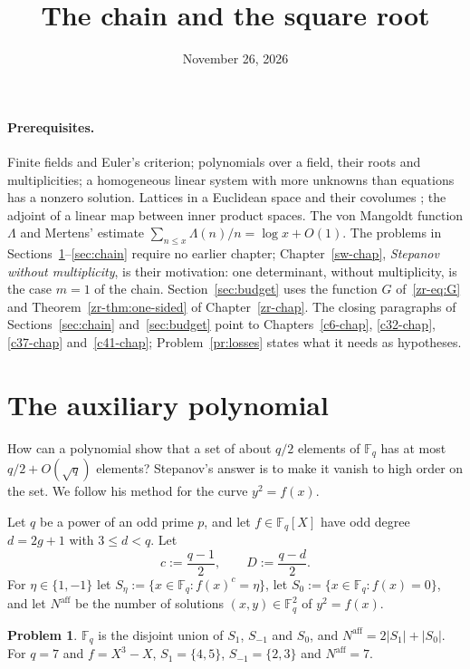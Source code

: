 \documentclass[reqno]{amsart}
\title{The chain and the square root}
\author{}
\date{November 26, 2026}
\newcounter{chap}
\theoremstyle{definition}
\newtheorem{problem}{Problem}[section]
\theoremstyle{plain}
\newcommand{\F}{\mathbb{F}}
\newcommand{\Naff}{N^{\mathrm{aff}}}
\begin{document}
\maketitle
{}\label{chap}

\paragraph{Prerequisites.}
Finite fields and Euler's criterion; polynomials over a field, their roots and multiplicities; a homogeneous linear system with more unknowns than equations has a nonzero solution.  Lattices in a Euclidean space and their covolumes \cite[Ch.~I, \S4]{Ne}; the adjoint of a linear map between inner product spaces.  The von Mangoldt function \(\Lambda\) and Mertens' estimate \(\sum_{n \le x} \Lambda(n)/n = \log x + O(1)\).  The problems in Sections~\ref{sec:aux}--\ref{sec:chain} require no earlier chapter; Chapter~\ref{sw-chap}, \emph{Stepanov without multiplicity}, is their motivation: one determinant, without multiplicity, is the case \(m = 1\) of the chain.  Section~\ref{sec:budget} uses the function \(G\) of~\eqref{zr-eq:G} and Theorem~\ref{zr-thm:one-sided} of Chapter~\ref{zr-chap}.  The closing paragraphs of Sections~\ref{sec:chain} and~\ref{sec:budget} point to Chapters~\ref{c6-chap}, \ref{c32-chap}, \ref{c37-chap} and~\ref{c41-chap}; Problem~\ref{pr:losses} states what it needs as hypotheses.

\section{The auxiliary polynomial}\label{sec:aux}

How can a polynomial show that a set of about \(q/2\) elements of \(\F_q\) has at most \(q/2 + O(\sqrt q)\) elements?  Stepanov's answer \cite{Ste69} is to make it vanish to high order on the set.  We follow his method for the curve \(y^2 = f(x)\).

Let \(q\) be a power of an odd prime \(p\), and let \(f \in \F_q[X]\) have odd degree \(d = 2g + 1\) with \(3 \le d < q\).  Let
\[
  c := \frac{q-1}{2} , \qquad D := \frac{q-d}{2} .
\]
For \(\eta \in \{1, -1\}\) let \(S_\eta := \{x \in \F_q : f(x)^c = \eta\}\), let \(S_0 := \{x \in \F_q : f(x) = 0\}\), and let \(\Naff\) be the number of solutions \((x, y) \in \F_q^2\) of \(y^2 = f(x)\).

\begin{problem}\label{pr:euler}
\(\F_q\) is the disjoint union of \(S_1\), \(S_{-1}\) and \(S_0\), and \(\Naff = 2\lvert S_1 \rvert + \lvert S_0 \rvert\).  For \(q = 7\) and \(f = X^3 - X\), \(S_1 = \{4, 5\}\), \(S_{-1} = \{2, 3\}\) and \(\Naff = 7\).
\end{problem}
\end{document}
